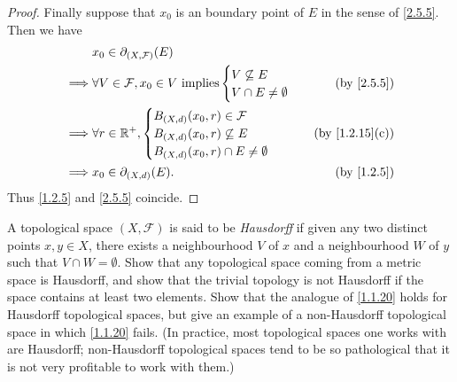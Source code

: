 \begin{proof}
  Finally suppose that \(x_0\) is an boundary point of \(E\) in the sense of \cref{2.5.5}.
  Then we have
  \begin{align*}
             & x_0 \in \partial_{(X, \mathcal{F})}(E)                                                        \\
    \implies & \forall V \in \mathcal{F}, x_0 \in V \text{ implies} \begin{cases}
                                                                      V \not\subseteq E \\
                                                                      V \cap E \neq \emptyset
                                                                    \end{cases} & \text{(by \cref{2.5.5})}   \\
    \implies & \forall r \in \R^+, \begin{cases}
                                     B_{(X, d)}(x_0, r) \in \mathcal{F} \\
                                     B_{(X, d)}(x_0, r) \not\subseteq E \\
                                     B_{(X, d)}(x_0, r) \cap E \neq \emptyset
                                   \end{cases}                           & \text{(by \cref{1.2.15}(c))}      \\
    \implies & x_0 \in \partial_{(X, d)}(E).                                      & \text{(by \cref{1.2.5})}
  \end{align*}
  Thus \cref{1.2.5} and \cref{2.5.5} coincide.
\end{proof}

\begin{ex}\label{ex:2.5.4}
  A topological space \((X, \mathcal{F})\) is said to be \emph{Hausdorff} if given any two distinct points \(x, y \in X\), there exists a neighbourhood \(V\) of \(x\) and a neighbourhood \(W\) of \(y\) such that \(V \cap W = \emptyset\).
  Show that any topological space coming from a metric space is Hausdorff, and show that the trivial topology is not Hausdorff if the space contains at least two elements.
  Show that the analogue of \cref{1.1.20} holds for Hausdorff topological spaces, but give an example of a non-Hausdorff topological space in which \cref{1.1.20} fails.
  (In practice, most topological spaces one works with are Hausdorff;
  non-Hausdorff topological spaces tend to be so pathological that it is not very profitable to work with them.)
\end{ex}

